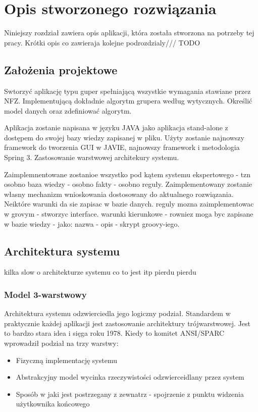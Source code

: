 \chapter{Opis stworzonego rozwiązania}
\label{cha:rozwiazanie}

Niniejszy rozdział zawiera opis aplikacji, która została stworzona na potrzeby tej pracy. Krótki opis co zawieraja kolejne podrozdzialy/// TODO

\section{Założenia projektowe}
\label{sec:zalozeniaProjektowe}
Swtorzyć aplikację typu guper spełniającą wszystkie wymagania stawiane przez NFZ. Implementującą dokładnie algorytm grupera według wytycznych.
Określić model danych oraz zdefiniować algorytm.

Aplikacja zostanie napisana w języku JAVA jako aplikacja stand-alone z dostępem do swojej bazy wiedzy zapisanej w pliku. 
Użyty zostanie najnowszy framework do tworzenia GUI w JAVIE, najnowszy framework i metodologia Spring 3. Zastosowanie warstwowej architekury systemu.

Zaimplemnentowane zostanioe wszystko pod kątem systemu ekspertowego - tzn osobno baza wiedzy - osobno fakty - osobno reguły. Zaimplementowany zostanie własny mechanizm wnioskowania dostosowany do aktualnego rozwiązania.
Neiktóre warunki da sie zapisac w bazie danych. reguly mozna zaimplementowac w grovym - stworzyc interface. warunki kierunkowe - rowniez moga byc zapisane w bazie wiedzy - jako: nazwa - opis - skrypt groovy-iego.


\section{Architektura systemu}
\label{sec:architekturaSystemu}
kilka slow o architekturze systemu co to jest itp pierdu pierdu

\subsection{Model 3-warstwowy}
\label{sec:model3warstwowy}
Architektura systemu odzwierciedla jego logiczny podział. Standardem w praktycznie każdej aplikacji jest zastosowanie architektury trójwarstwowej. Jest to bardzo stara idea i sięga roku 1978. Kiedy to komitet ANSI/SPARC wprowadził podział na trzy warstwy:
\begin{itemize}
 \item Fizyczną implementację systemu
 \item Abstrakcyjny model wycinka rzeczywistości odzwierceidlany przez system
 \item Sposób w jaki jest postrzegany z zewnatrz - spojrzenie z punktu widzenia użytkownika końcowego
\end{itemize}

